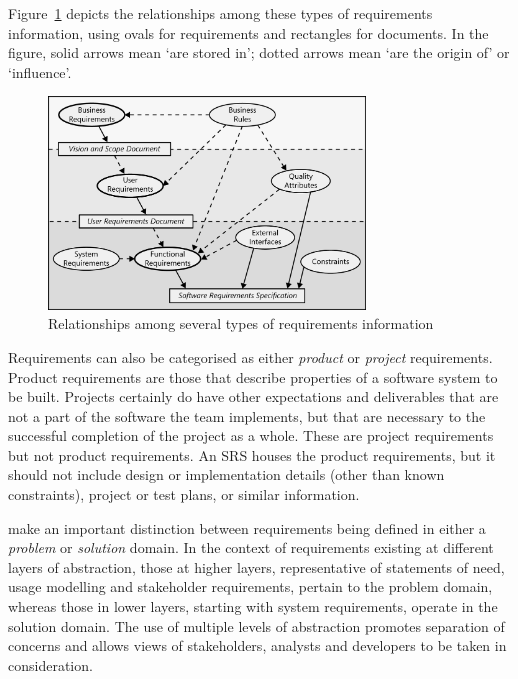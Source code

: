 \documentclass[dissertation,final]{softeng}
\begin{document}
Figure~\ref{fig:types_of_requirements} depicts the relationships among these types of requirements information, using ovals for requirements and rectangles for documents. In the figure, solid arrows mean `are stored in'; dotted arrows mean `are the origin of' or `influence'.
\begin{figure}[h!]
\includegraphics[width=0.75\textwidth]{TypesOfRequirements}
\centering
\caption[Types of Requirements]{Relationships among several types of requirements information~\citep[p. 8]{Wiegers2013}}
\label{fig:types_of_requirements}
\end{figure}

Requirements can also be categorised as either \emph{product} or \emph{project} requirements. Product requirements are those that describe properties of a software system to be built. Projects certainly do have other expectations and deliverables that are not a part of the software the team implements, but that are necessary to the successful completion of the project as a whole. These are project requirements but not product requirements. An SRS houses the product requirements, but it should not include design or implementation details (other than known constraints), project or test plans, or similar information.

\citet{Hull2011} make an important distinction between requirements being defined in either a \emph{problem} or \emph{solution} domain. In the context of requirements existing at different layers of abstraction, those at higher layers, representative of statements of need, usage modelling and stakeholder requirements, pertain to the problem domain, whereas those in lower layers, starting with system requirements, operate in the solution domain. The use of multiple levels of abstraction promotes separation of concerns and allows views of stakeholders, analysts and developers to be taken in consideration.
\end{document}
